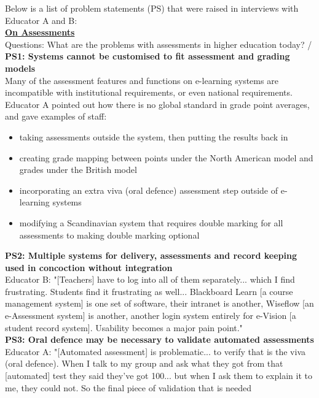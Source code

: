 Below is a list of problem statements (PS) that were raised in interviews with Educator A and B:\vspace{0.25cm}\\
\underline{\textbf{On Assessments}}\\
Questions: What are the problems with assessments in higher education today? / \vspace{0.25cm}\\
\textbf{PS1: Systems cannot be customised to fit assessment and grading models}\\
Many of the assessment features and functions on e-learning systems are incompatible 
with institutional requirements, or even national requirements. Educator A pointed out how there is 
no global standard in grade point averages, and gave examples of staff:
\begin{itemize}
    \setlength\itemsep{0em}
    \item taking assessments outside the system, then putting the results back in
    \item creating grade mapping between points under the North American model and 
    grades under the British model
    \item incorporating an extra viva (oral defence) assessment step outside of e-learning systems
    \item modifying a Scandinavian system that requires double marking for all assessments 
    to making double marking optional
\end{itemize}
\textbf{PS2: Multiple systems for delivery, assessments and record keeping used in concoction without integration}\\
Educator B: "[Teachers] have to log into all of them separately... which I find frustrating. Students 
find it frustrating as well... Blackboard Learn [a course management system] is one set of software, 
their intranet is another, Wiseflow [an e-Assessment system] is another, another login system entirely 
for e-Vision [a student record system]. Usability becomes a major pain point."\vspace{0.25cm}\\
\textbf{PS3: Oral defence may be necessary to validate automated assessments}\\
Educator A: "[Automated assessment] is problematic... to verify that is the viva (oral defence).
When I talk to my group and ask what they got from that [automated] test they said they've got 100... 
but when I ask them to explain it to me, they could not. So the final piece of validation that is needed
